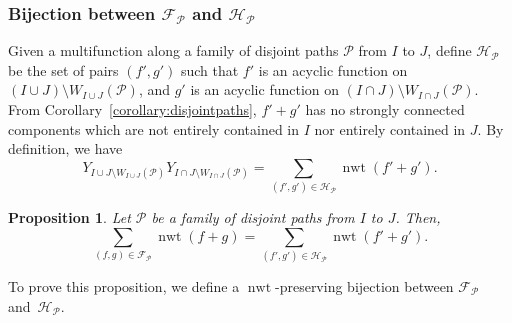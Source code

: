 \documentclass[11pt]{article}
\newtheorem{prop}[theo]{Proposition}
\theoremstyle{definition}
\numberwithin{equation}{section}
\DeclareMathOperator{\normalizedweight}{nwt}
\begin{document}
\subsubsection{Bijection between \texorpdfstring{\(\mathcal{F}_{\mathcal{P}}\) and \(\mathcal{H}_{\mathcal{P}}\)}{FP and HP}}

Given a multifunction along a family of disjoint paths \(\mathcal{P}\) from \(I\) to \(J\),
define \(\mathcal{H}_{\mathcal{P}}\) be the set of pairs \((f', g')\) such that
\(f'\) is an acyclic function on \((I \cup J) \setminus W_{I \cup J}(\mathcal{P})\), and
\(g'\) is an acyclic function on \((I \cap J) \setminus W_{I \cap J}(\mathcal{P})\).
From Corollary~\ref{corollary:disjointpaths},
\(f' + g'\) has no strongly connected components which are not entirely contained in \(I\) nor entirely contained in \(J\).
By definition, we have
\begin{equation*}
    Y_{I \cup J \setminus W_{I \cup J}(\mathcal{P})} Y_{I \cap J \setminus W_{I \cap J}(\mathcal{P})}
    =
    \sum_{(f', g') \in \mathcal{H}_{\mathcal{P}}} \normalizedweight(f' + g').
\end{equation*}

\begin{prop} \label{proposition:nwt-fp-hp}
    Let \(\mathcal{P}\) be a family of disjoint paths from \(I\) to \(J\).
    Then,
    \begin{equation*}
    \sum_{(f,g) \in \mathcal{F}_{\mathcal{P}}} \normalizedweight(f+g)
    =
    \sum_{(f',g') \in \mathcal{H}_{\mathcal{P}}} \normalizedweight(f'+g').
    \end{equation*}
\end{prop}

To prove this proposition, we define a \(\normalizedweight\)-preserving bijection between \(\mathcal{F}_{\mathcal{P}}\) and~\(\mathcal{H}_{\mathcal{P}}\).
\end{document}
